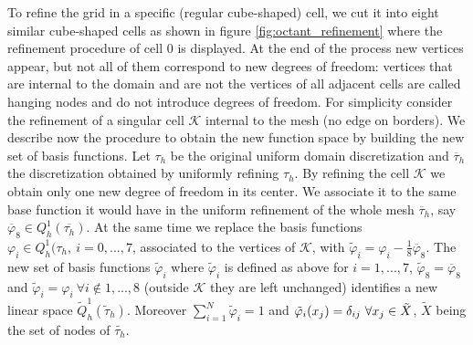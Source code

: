 \documentclass[11pt,a4paper]{article}
\begin{document}
To refine the grid in a specific (regular cube-shaped) cell, we cut it into eight similar cube-shaped cells as shown in figure \ref{fig:octant_refinement} where the refinement procedure of cell 0 is displayed. At the end of the process new vertices appear, but not all of them correspond to new degrees of freedom: vertices that are internal to the domain and are not the vertices of all adjacent cells are called hanging nodes and do not introduce degrees of freedom. For simplicity consider the refinement of a singular cell \(\mathcal{K}\) internal to the mesh (no edge on borders). We describe now the procedure to obtain the new function space by building the new set of basis functions. Let \(\tau_h\) be the original uniform domain discretization and \(\overline{\tau}_h\) the discretization obtained by uniformly refining \(\tau_h\). By refining the cell \(\mathcal{K}\) we obtain only one new degree of freedom in its center. We associate it to the same base function it would have in the uniform refinement of the whole mesh \(\overline{\tau}_h\), say \(\overline{\varphi}_8\in Q_h^1(\overline{\tau_h})\). At the same time we replace the basis functions \(\varphi_i \in Q_h^1(\tau_h,\ i=0,...,7\), associated to the vertices of \(\mathcal{K}\), with \(\tilde{\varphi}_i=\varphi_i-\frac{1}{8}\overline{\varphi}_8\). The new set of basis functions \(\tilde{\varphi}_i\) where \(\tilde{\varphi}_i\) is defined as above for \(i=1,...,7\), \(\tilde{\varphi}_8=\overline{\varphi}_8\) and \(\tilde{\varphi}_i = \varphi_i\ \forall i \notin 1,...,8\) (outside \(\mathcal{K}\) they are left unchanged) identifies a new linear space \(\tilde{Q}_h^1(\tilde{\tau}_h)\). Moreover \(\sum_{i=1}^N\tilde{\varphi}_i=1\) and \(\Tilde{\varphi}_i(x_j)=\delta_{ij}\ \forall x_j\in \tilde{X}\), \(\tilde{X}\) being the set of nodes of \(\tilde{\tau_h}\).
\end{document}
